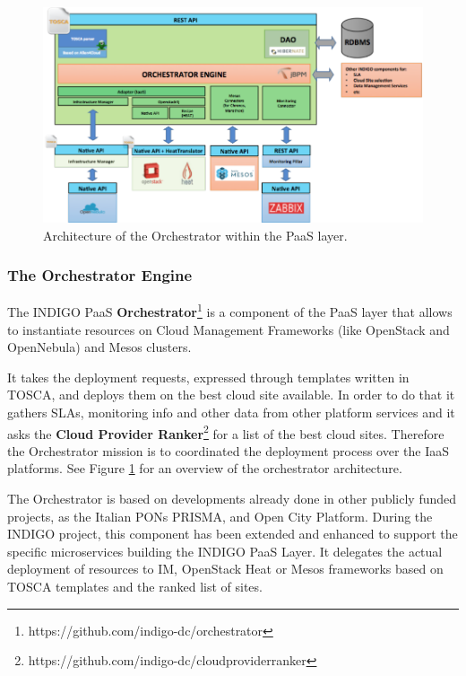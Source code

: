\documentclass{article}
\begin{document}
\begin{figure}
  \centering
  \includegraphics[width=\textwidth]{./figs/Figure4.pdf}
  \caption{Architecture of the Orchestrator within the PaaS layer.}
  \label{fig:4}
\end{figure}



\subsubsection{The Orchestrator Engine}


The INDIGO PaaS {\bf Orchestrator}\footnote{https://github.com/indigo-dc/orchestrator} is a component of the PaaS layer that allows to instantiate resources on Cloud Management Frameworks (like OpenStack and OpenNebula) and Mesos clusters.

It takes the deployment requests, expressed through templates written in TOSCA, and deploys them on the best cloud site available. In order to do that it gathers SLAs, monitoring info and other data from other platform services and it asks the {\bf Cloud Provider Ranker}\footnote{https://github.com/indigo-dc/cloudproviderranker} for a list of the best cloud sites. Therefore the Orchestrator mission is to coordinated the deployment process over the IaaS platforms. See Figure \ref{fig:4} for an overview of the orchestrator architecture.

The Orchestrator is based on developments already done in other publicly funded projects, as the Italian PONs PRISMA\cite{PRISMA}, and Open City Platform\cite{OPENCITY}. During the INDIGO project, this component has been extended and enhanced to support the specific microservices building the INDIGO PaaS Layer. It delegates the actual deployment of resources to IM, OpenStack Heat or Mesos frameworks based on TOSCA templates and the ranked list of sites.
\end{document}
